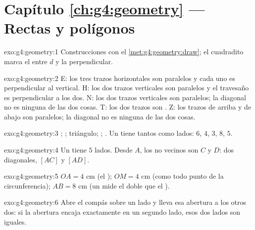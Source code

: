 \section*{Capítulo \ref{ch:g4:geometry} --- Rectas y polígonos}

\begin{solution}{exo:g4:geometry:1}
Construcciones con el \cref{met:g4:geometry:draw}; el cuadradito
marca el  entre $d$ y la perpendicular.
\end{solution}

\begin{solution}{exo:g4:geometry:2}
E: los tres trazos horizontales son paralelos y cada uno es perpendicular
al vertical. H: los dos trazos verticales son paralelos y el
travesaño es perpendicular a los dos. N: los dos trazos verticales son
paralelos; la diagonal no es ninguna de las dos cosas. T: los dos trazos son
. Z: los trazos de arriba y de abajo son paralelos; la
diagonal no es ninguna de las dos cosas.
\end{solution}

\begin{solution}{exo:g4:geometry:3}
; ; triángulo; ; . Un  tiene
tantos  como lados: $6$, $4$, $3$, $8$, $5$.
\end{solution}

\begin{solution}{exo:g4:geometry:4}
Un  tiene $5$ lados. Desde $A$, los  no vecinos son $C$ y
$D$: dos diagonales, $[AC]$ y $[AD]$.
\end{solution}

\begin{solution}{exo:g4:geometry:5}
$OA = 4$ cm (el ); $OM = 4$ cm (como todo punto de la circunferencia);
$AB = 8$ cm (un  mide el doble que el ).
\end{solution}

\begin{solution}{exo:g4:geometry:6}
Abre el compás sobre un lado y lleva esa abertura a los otros
dos: si la abertura encaja exactamente en un segundo lado,
esos dos lados son iguales.
\end{solution}

